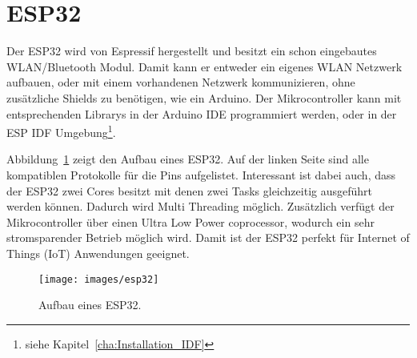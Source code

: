 \section{ESP32}
Der ESP32 wird von Espressif hergestellt und besitzt ein schon eingebautes WLAN/Bluetooth Modul. Damit kann er entweder ein eigenes WLAN Netzwerk aufbauen, oder mit einem vorhandenen Netzwerk kommunizieren, ohne zusätzliche Shields zu benötigen, wie ein Arduino. Der Mikrocontroller kann mit entsprechenden Librarys in der Arduino IDE programmiert werden, oder in der ESP IDF Umgebung\footnote{siehe Kapitel~\ref{cha:Installation_IDF}}.

Abbildung~\ref{fig:esp32} zeigt den Aufbau eines ESP32. Auf der linken Seite sind alle kompatiblen Protokolle für die Pins aufgelistet. Interessant ist dabei auch, dass der ESP32 zwei Cores besitzt mit denen zwei Tasks gleichzeitig ausgeführt werden können. Dadurch wird Multi Threading möglich. Zusätzlich verfügt der Mikrocontroller über einen Ultra Low Power coprocessor, wodurch ein sehr stromsparender Betrieb möglich wird. Damit ist der ESP32 perfekt für Internet of Things (IoT) Anwendungen geeignet.

\begin{figure}[hbt]
	\centering
	\texttt{[image: images/esp32]}
	\caption[ESP32 Aufbau]{Aufbau eines ESP32.}
	\label{fig:esp32}
\end{figure}
